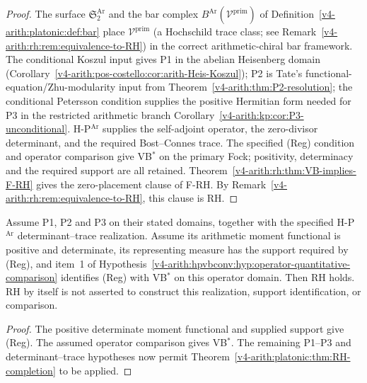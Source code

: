 \begin{proof}
The surface \(\mathfrak{S}^{\mathrm{Ar}}_{2}\) and the bar complex
\(B^{\mathrm{Ar}}(\mathcal{V}^{\mathrm{prim}})\) of
Definition~\ref{v4-arith:platonic:def:bar} place
\(\mathcal{V}^{\mathrm{prim}}\) (a Hochschild trace class; see
Remark~\ref{v4-arith:rh:rem:equivalence-to-RH}) in the correct
arithmetic-chiral bar framework. The conditional Koszul input gives
P1 in the abelian Heisenberg domain
(Corollary~\ref{v4-arith:pos-costello:cor:arith-Heis-Koszul}); P2 is Tate's
functional-equation/Zhu-modularity input from
Theorem~\ref{v4-arith:thm:P2-resolution}; the conditional Petersson condition
supplies the positive Hermitian form needed for P3 in the restricted
arithmetic branch Corollary~\ref{v4-arith:kp:cor:P3-unconditional}.
H-P\(^{\mathrm{Ar}}\) supplies the self-adjoint operator, the
zero-divisor determinant, and the required Bost--Connes trace.
The specified (Reg) condition and operator comparison give
VB\(^{*}\) on the primary Fock; positivity, determinacy and the
required support are all retained.
Theorem~\ref{v4-arith:rh:thm:VB-implies-F-RH} gives the zero-placement clause
of F-RH. By Remark~\ref{v4-arith:rh:rem:equivalence-to-RH}, this clause is
RH.
\end{proof}

\begin{corollary}
\label{v4-arith:platonic:cor:single-positivity}
Assume P1, P2 and P3 on their stated domains, together with the
specified H-P\(^{\mathrm{Ar}}\) determinant--trace realization.
Assume its arithmetic moment functional is positive and determinate,
its representing measure has the support required by (Reg), and
item~1 of
Hypothesis~\ref{v4-arith:hpvbconv:hyp:operator-quantitative-comparison}
identifies (Reg) with VB\(^{*}\) on this operator domain. Then RH holds.
RH by itself is not asserted to construct this realization,
support identification, or comparison.
\end{corollary}
\begin{proof}
The positive determinate moment functional and supplied support
give (Reg). The assumed operator comparison gives VB\(^{*}\).
The remaining P1--P3 and determinant--trace hypotheses now permit
Theorem~\ref{v4-arith:platonic:thm:RH-completion} to be applied.
\end{proof}

